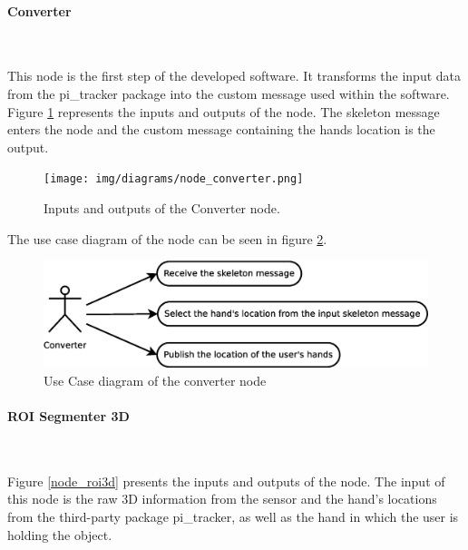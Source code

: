 

\paragraph{Converter}\mbox{}\\
		\label{converter}

	This node is the first step of the developed software. 
	It transforms the input data from the pi\_tracker package into the custom message used within the software. 
	Figure \ref{node_converter} represents the inputs and outputs of the node. 
	The skeleton message enters the node and the custom message containing the hands location is the output. 

		\begin{figure}[H]
			\begin{center}
			\texttt{[image: img/diagrams/node\_converter.png]}
			\caption[Converter node I/O]{Inputs and outputs of the Converter node.}		
			\label{node_converter}
			\end{center}
		\end{figure}

	The use case diagram of the node can be seen in figure \ref{uc_converter}. 

	\begin{figure}[H]
		\centering
		\includegraphics[scale=0.4]{img/diagrams/uc_converter.eps}
		\caption[Use case diagram converter node]{Use Case diagram of the converter node}
		\label{uc_converter}
	\end{figure}

	

\paragraph{ROI Segmenter 3D}\mbox{}\\
	\label{roi_segmenter_3d}

	Figure  \ref{node_roi3d} presents the inputs and outputs of the node. 
	The input of this node is the raw 3D information from the sensor and the hand's locations from the third-party package pi\_tracker, as well as the hand in which the user is holding the object. 

